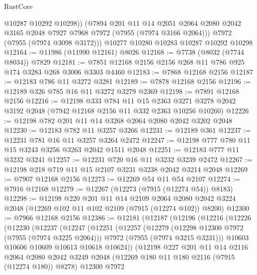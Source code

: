 \begin{lexlean}{RustCore}
\begin{coremodule}
          @10287
          @10292
          @10298))
      (@7894
        @201
        @11
        @14
        @2051
        @2064
        @2080
        @2042
        @3165
        @2048
        @7927
        @7968
        @7972
        (@7955 (@7974 @3166 @2064)))
      @7972
      (@7955 (@7974 @3098 @3172)))
    @10277
    @10280
    @10283
    @10287
    @10292
    @10298
@12164 := @11986 (@11990 @12161) @8026
@12168 := @7738 (@8032 (@7744 @8034)) @7829
@12181 := @7851 @12168 @2156 @2156 @268 @11 @786 @925 @174 @3283 @268 @3006 @3303 @4460
@12183 := @7868 @12168 @2156
@12187 := @12183 @786 @11 @3272 @3281
@12189 := @7878 @12168 @2156
@12196 := @12189 @326 @785 @16 @11 @3272 @3279 @2369
@12198 := @7891 @12168 @2156
@12216 := @12198
    @333
    @784
    @11
    @15
    @2363
    @3271
    @3278
    @2042
    @3192
    @2048
    (@7942 @12168 @2156 @11 @332 @2363 @10256 @10260)
@12226 := @12198 @782 @201 @11 @14 @3268 @2064 @2080 @2042 @3202 @2048
@12230 := @12183 @782 @11 @3257 @3266
@12231 := @12189 @361
@12237 := @12231 @781 @16 @11 @3257 @3264 @2472
@12247 := @12198 @777 @780 @11 @15 @3243 @3256 @3263 @2042 @1511 @2048
@12251 := @12183 @777 @11 @3232 @3241
@12257 := @12231 @720 @16 @11 @3232 @3239 @2472
@12267 := @12198 @218 @719 @11 @15 @2107 @3231 @3238 @2042 @3214 @2048
@12269 := @7907 @12168 @2156
@12273 := @12269 @54 @11 @54 @2107
@12274 := @7916 @12168
@12279 := @12267 (@12273 (@7915 (@12274 @54)) @8183)
@12298 := @12198
    @220
    @201
    @11
    @14
    @2109
    @2064
    @2080
    @2042
    @3224
    @2048
    (@12269 @102 @11 @102 @2109 (@7915 (@12274 @102)) @8200)
@12300 := @7966 @12168 @2156
@12386 := @12181
    (@12187
      (@12196
        (@12216
          (@12226
            (@12230
              (@12237
                (@12247
                  (@12251
                    (@12257
                      (@12279
                        (@12298 @12300 @7972 (@7955 (@7974 @3225 @2064)))
                        @7972
                        (@7955 (@7974 @3215 @3231)))
                      @10603
                      @10606
                      @10609
                      @10613
                      @10618
                      @10624))
                  (@12198
                    @227
                    @201
                    @11
                    @14
                    @2116
                    @2064
                    @2080
                    @2042
                    @3249
                    @2048
                    (@12269 @180 @11 @180 @2116 (@7915 (@12274 @180)) @8278)
                    @12300
                    @7972

\end{coremodule}
\end{lexlean}

